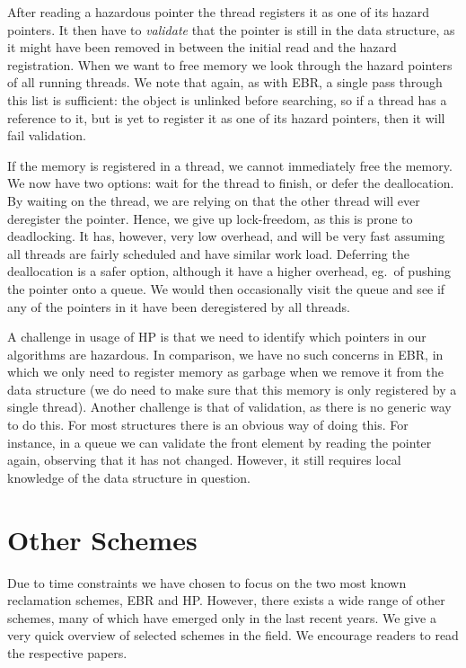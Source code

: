\documentclass[b5paper]{report}
\begin{document}
After reading a hazardous pointer the thread registers it as one of its hazard
pointers. It then have to \emph{validate} that the pointer is still in the data
structure, as it might have been removed in between the initial read and the
hazard registration. When we want to free memory we look through the hazard
pointers of all running threads. We note that again, as with EBR, a single pass
through this list is sufficient: the object is unlinked before searching, so if
a thread has a reference to it, but is yet to register it as one of its hazard
pointers, then it will fail validation.

If the memory is registered in a thread, we cannot immediately free the memory.
We now have two options: wait for the thread to finish, or defer the
deallocation.  By waiting on the thread, we are relying on that the other thread
will ever deregister the pointer. Hence, we give up lock-freedom, as this is
prone to deadlocking. It has, however, very low overhead, and will be very fast
assuming all threads are fairly scheduled and have similar work load.  Deferring
the deallocation is a safer option, although it have a higher overhead, eg.\ of
pushing the pointer onto a queue. We would then occasionally visit the queue and
see if any of the pointers in it have been deregistered by all threads.

A challenge in usage of HP is that we need to identify which pointers in our
algorithms are hazardous. In comparison, we have no such concerns in EBR, in
which we only need to register memory as garbage when we remove it from the data
structure (we do need to make sure that this memory is only registered by a
single thread). Another challenge is that of validation, as there is no generic
way to do this. For most structures there is an obvious way of doing this. For
instance, in a queue we can validate the front element by reading the
 pointer again, observing that it has not changed. However, it still
requires local knowledge of the data structure in question.

\section{Other Schemes\label{sec:other-schemes}}

Due to time constraints we have chosen to focus on the two most known
reclamation schemes, EBR and HP\@. However, there exists a wide range of other
schemes, many of which have emerged only in the last recent years. We give a
very quick overview of selected schemes in the field. We encourage readers to
read the respective papers.
\end{document}
